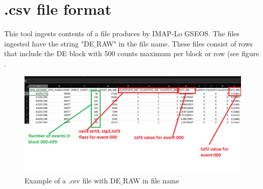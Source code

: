 \documentclass[12pt]{article}
\begin{document}
 

\section{.csv file format}
This tool ingests contents of a file produces by IMAP-Lo GSEOS. The files ingested have the string "DE$\_$RAW" in the file name. These files consist of rows that include the DE block with 500 counts maximum per block or row (see figure .

\begin{figure}[h]
\caption{Example of a .csv file with DE$\_$RAW in file name }
\centering
\includegraphics[width=1\textwidth]{csv1}
\end{figure}
\end{document}
